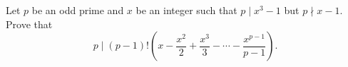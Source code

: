 Let $p$ be an odd prime and $x$ be an integer such that $p \mid x^3 - 1$ but $p \nmid x - 1$. Prove that \[ p \mid (p - 1)!\left(x - \frac {x^2}{2} + \frac {x^3}{3} - \cdots - \frac {x^{p - 1}}{p - 1}\right).\]